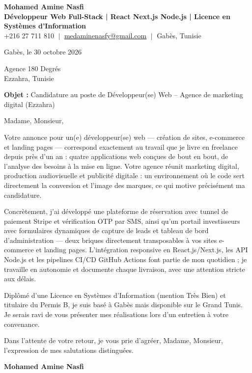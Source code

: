 \documentclass[11pt,a4paper]{article}
\begin{document}
\begin{center}
    \textbf{\Huge \color{navy} Mohamed Amine Nasfi} \\[3pt]
    \small \textbf{\color{accent} Développeur Web Full-Stack | React \textperiodcentered{} Next.js \textperiodcentered{} Node.js | Licence en Systèmes d'Information} \\[3pt]
    \footnotesize \color{greytext}
    +216 27 711 810 $\;|\;$
    \href{mailto:medaminenasfy@gmail.com}{\underline{medaminenasfy@gmail.com}} $\;|\;$
    Gabès, Tunisie
\end{center}

\vspace{8pt}
\hfill Gabès, le 30 octobre 2026

\vspace{12pt}
Agence 180 Degrés \\ Ezzahra, Tunisie

\vspace{10pt}
\textbf{Objet :} Candidature au poste de Développeur(se) Web – Agence de marketing digital (Ezzahra)

\vspace{4pt}
Madame, Monsieur,

Votre annonce pour un(e) développeur(se) web — création de sites, e-commerce et landing pages — correspond exactement au travail que je livre en freelance depuis près d'un an : quatre applications web conçues de bout en bout, de l'analyse des besoins à la mise en ligne. Votre agence réunit marketing digital, production audiovisuelle et publicité digitale : un environnement où le code sert directement la conversion et l'image des marques, ce qui motive précisément ma candidature.

Concrètement, j'ai développé une plateforme de réservation avec tunnel de paiement Stripe et vérification OTP par SMS, ainsi qu'un portail investisseurs avec formulaires dynamiques de capture de leads et tableau de bord d'administration — deux briques directement transposables à vos sites e-commerce et landing pages. L'intégration responsive en React.js/Next.js, les API Node.js et les pipelines CI/CD GitHub Actions font partie de mon quotidien ; je travaille en autonomie et documente chaque livraison, avec une attention stricte aux délais.

Diplômé d'une Licence en Systèmes d'Information (mention Très Bien) et titulaire du Permis B, je suis basé à Gabès mais disponible sur le Grand Tunis. Je serais ravi de vous présenter mes réalisations lors d'un entretien à votre convenance.

Dans l'attente de votre retour, je vous prie d'agréer, Madame, Monsieur, l'expression de mes salutations distinguées.

\vspace{14pt}
\hfill \textbf{Mohamed Amine Nasfi}
\end{document}
